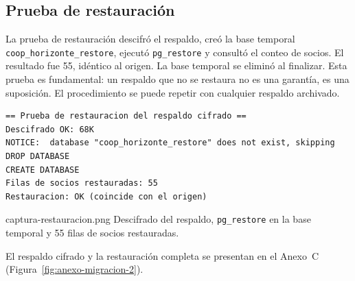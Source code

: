 \begin{table}[H]
  \centering
  \caption{Respaldos generados durante la migración}
  \label{tab:respaldos}
\end{table}

\subsection{Prueba de restauración}

La prueba de restauración descifró el respaldo, creó la base temporal
\texttt{coop\_horizonte\_restore}, ejecutó \texttt{pg\_restore} y consultó el
conteo de socios. El resultado fue 55, idéntico al origen. La base temporal se
eliminó al finalizar. Esta prueba es fundamental: un respaldo que no se
restaura no es una garantía, es una suposición. El procedimiento se puede
repetir con cualquier respaldo archivado.

\begin{lstlisting}[style=terminal,caption={Prueba real de restauración del respaldo cifrado},label={lst:restauracion}]
== Prueba de restauracion del respaldo cifrado ==
Descifrado OK: 68K
NOTICE:  database "coop_horizonte_restore" does not exist, skipping
DROP DATABASE
CREATE DATABASE
Filas de socios restauradas: 55
Restauracion: OK (coincide con el origen)
\end{lstlisting}

%
  {captura-restauracion.png}%
  {Descifrado del respaldo, \texttt{pg\_restore} en la base temporal y 55 filas de socios restauradas.}

El respaldo cifrado y la restauración completa se presentan en el Anexo~C
(Figura~\ref{fig:anexo-migracion-2}).


